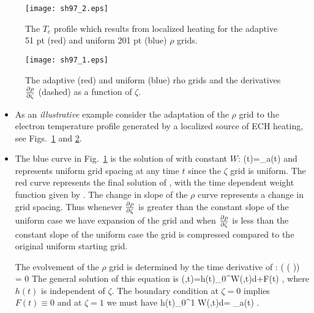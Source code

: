 \begin{figure}
 \texttt{[image: sh97\_2.eps]}
 \caption{The $T_e $ profile which results from  localized heating for the
 adaptive 51 pt (red) and uniform 201 pt (blue) $\rho $ grids.\label{fig1}}
\end{figure}
\begin{figure}
 \texttt{[image: sh97\_1.eps]}
 \caption{The adaptive (red) and uniform (blue) rho grids and the derivatives
 $\frac{\partial{ \rho}}{\partial{ \zeta}} $ (dashed) as a function of $\zeta$.\label{fig2}}
\end{figure}
\begin{itemize}
 \item As an \emph{illustrative} example consider the adaptation of the $\rho$
 grid to the electron temperature profile generated by a localized source of ECH
 heating, see Figs.~\ref{fig1} and \ref{fig2}.
 \item   The blue curve in Fig.~\ref{fig1} is the solution of 
 with constant $W $:
 \beq
  \rho(t)=\rho_a(t)\zeta
 \eeq
 and represents uniform grid spacing at any time $t$ since the $\zeta$ grid is
 uniform. The red curve represents the final solution of , with the
 time dependent weight function given by . The change in slope of
 the $\rho $ curve represents a change in grid spacing. Thus whenever
 $\frac{\partial{ \rho}}{\partial{ \zeta}} $ is greater than the constant slope of the uniform case
 we have expansion of the grid and when  $\frac{\partial{ \rho}}{\partial{ \zeta}} $ is less than
 the  constant slope of the uniform case the grid is compressed compared to the
 original uniform starting grid.

 The evolvement of the $\rho $ grid is determined by the time derivative of
 :
 \beq
   \left (
  \ddiff{\zeta}\left (\pdiff{\rho}{\zeta} 
  \right )\right ) = 0  \label{weq3}
 \eeq
 The general solution of this equation is
 \beq
  \rho(\zeta,t)=h(t)\int_0^\zeta W(\zeta,t)d\zeta +F(t)  \label{eqn0},
 \eeq
 where $h(t)$ is independent of $\zeta $. The boundary condition at $\zeta =0$
 implies $F(t) \equiv 0 $ and at $\zeta=1 $ we must have 
 \beq
  h(t)\int_0^1 W(\zeta,t)d\zeta = \rho_a(t) \label{eqnw}.
 \eeq
 \end{itemize}

